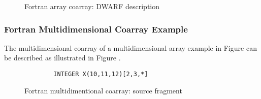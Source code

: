 \begin{figure}[here]
\caption{Fortran array coarray: DWARF description}
\label{fig:FortranarraycoarrayDWARFdescription}
\end{figure}

\subsubsection{Fortran Multidimensional Coarray Example}
The  multidimensional coarray of a multidimensional array example
in Figure  can be described as 
illustrated in Figure .

\begin{figure}[here]
\begin{lstlisting}
        INTEGER X(10,11,12)[2,3,*]
\end{lstlisting}
\caption{Fortran multidimentional coarray: source fragment}
\label{fig:Fortranmultidimensionalcoarraysourcefragment}
\end{figure}

